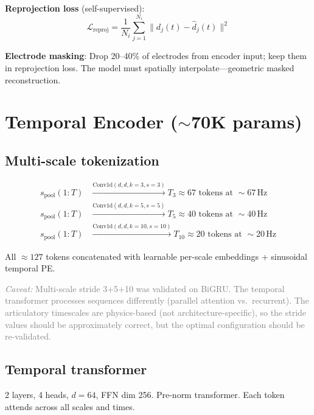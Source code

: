 \documentclass[11pt,letterpaper]{article}
\newcommand{\caveat}[1]{\par\smallskip\noindent\textcolor{gray}{\textit{Caveat:} #1}\smallskip}
\begin{document}
\textbf{Reprojection loss} (self-supervised):
\begin{equation}\label{eq:reproj}
\mathcal{L}_{\text{reproj}} = \frac{1}{N_i} \sum_{j=1}^{N_i} \bigl\| d_j(t) - \hat{d}_j(t) \bigr\|^2
\end{equation}

\textbf{Electrode masking}: Drop 20--40\% of electrodes from encoder input; keep them in reprojection loss. The model must spatially interpolate---geometric masked reconstruction.


\section{Temporal Encoder (${\sim}$70K params)}\label{sec:temporal}

\subsection{Multi-scale tokenization}

\begin{equation}
\begin{aligned}
s_{\text{pool}}(1{:}T) &\xrightarrow{\text{Conv1d}(d,d,k{=}3,s{=}3)} T_3 \approx 67 \text{ tokens at } {\sim}67\,\text{Hz}\\
s_{\text{pool}}(1{:}T) &\xrightarrow{\text{Conv1d}(d,d,k{=}5,s{=}5)} T_5 \approx 40 \text{ tokens at } {\sim}40\,\text{Hz}\\
s_{\text{pool}}(1{:}T) &\xrightarrow{\text{Conv1d}(d,d,k{=}10,s{=}10)} T_{10} \approx 20 \text{ tokens at } {\sim}20\,\text{Hz}
\end{aligned}
\end{equation}

All ${\approx}127$ tokens concatenated with learnable per-scale embeddings + sinusoidal temporal PE.

\caveat{Multi-scale stride 3+5+10 was validated on BiGRU. The temporal transformer processes sequences differently (parallel attention vs.\ recurrent). The articulatory timescales are physics-based (not architecture-specific), so the stride values should be approximately correct, but the optimal configuration should be re-validated.}

\subsection{Temporal transformer}

2 layers, 4 heads, $d{=}64$, FFN dim 256. Pre-norm transformer. Each token attends across all scales and times.
\end{document}
